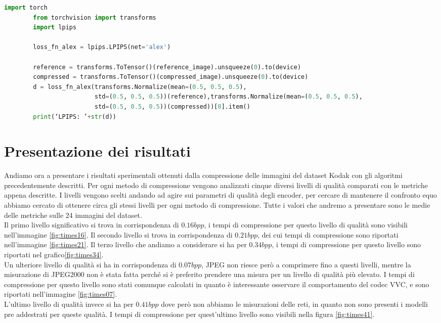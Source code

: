 \begin{adjustbox}{max width=\textwidth}   
    \begin{lstlisting}[language=Python, caption=Spezzone di codice per il calcolo di LPIPS con AlexNet, label=code:LPIPSComputation]
        import torch
        from torchvision import transforms
        import lpips
        
        loss_fn_alex = lpips.LPIPS(net='alex')
        
        reference = transforms.ToTensor()(reference_image).unsqueeze(0).to(device)
        compressed = transforms.ToTensor()(compressed_image).unsqueeze(0).to(device)
        d = loss_fn_alex(transforms.Normalize(mean=(0.5, 0.5, 0.5),
                         std=(0.5, 0.5, 0.5))(reference),transforms.Normalize(mean=(0.5, 0.5, 0.5),
                         std=(0.5, 0.5, 0.5))(compressed))[0].item()
        print(‘LPIPS: ’+str(d))
    \end{lstlisting}
\end{adjustbox} 
    

\section{Presentazione dei risultati}
Andiamo ora a presentare i risultati sperimentali ottenuti dalla compressione delle immagini del dataset Kodak con gli algoritmi precedentemente descritti. Per ogni metodo di compressione vengono analizzati cinque diversi livelli di qualità comparati con le metriche appena descritte. I livelli vengono scelti andando ad agire sui parametri di qualità degli encoder, per cercare di mantenere il confronto equo abbiamo cercato di ottenere circa gli stessi livelli per ogni metodo di compressione. Tutte i valori che andremo a presentare sono le medie delle metriche sulle 24 immagini del dataset.\\
Il primo livello significativo si trova in corrispondenza di $0.16bpp$, i tempi di compressione per questo livello di qualità sono visibili nell’immagine \ref{fig:times16}. Il secondo livello si trova in corrispondenza di $0.21bpp$, dei cui tempi di compressione sono riportati nell’immagine \ref{fig:times21}. Il terzo livello che andiamo a considerare si ha per $0.34bpp$, i tempi di compressione per questo livello sono riportati nel grafico\ref{fig:times34}.\\
Un ulteriore livello di qualità si ha in corrispondenza di $0.07bpp$, JPEG non riesce però a comprimere fino a questi livelli, mentre la misurazione di JPEG2000 non è stata fatta perché si è preferito prendere una misura per un livello di qualità più elevato. I tempi di compressione per questo livello sono stati comunque calcolati in quanto è interessante osservare il comportamento del codec VVC, e sono riportati nell’immagine \ref{fig:times07}.\\
L’ultimo livello di qualità invece si ha per $0.41bpp$ dove però non abbiamo le misurazioni delle reti, in quanto non sono presenti i modelli pre addestrati per queste qualità. I tempi di compressione per quest’ultimo livello sono visibili nella figura \ref{fig:times41}.\\

